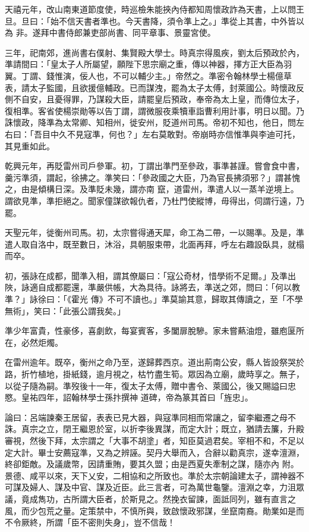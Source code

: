 \begin{pinyinscope}
 天禧元年，改山南東道節度使，時巡檢朱能挾內侍都知周懷政詐為天書，上以問王旦。旦曰：「始不信天書者準也。今天書降，須令準上之。」準從上其書，中外皆以為
 非。遂拜中書侍郎兼吏部尚書、同平章事、景靈宮使。



 三年，祀南郊，進尚書右僕射、集賢殿大學士。時真宗得風疾，劉太后預政於內，準請間曰：「皇太子人所屬望，願陛下思宗廟之重，傳以神器，擇方正大臣為羽翼。丁謂、錢惟演，佞人也，不可以輔少主。」帝然之。準密令翰林學士楊億草表，請太子監國，且欲援億輔政。已而謀洩，罷為太子太傅，封萊國公。時懷政反側不自安，且憂得罪，乃謀殺大臣，請罷皇后預政，奉帝為太上皇，而傳位太子，
 復相準。客省使楊崇勛等以告丁謂，謂微服夜乘犢車詣曹利用計事，明日以聞。乃誅懷政，降準為太常卿、知相州，徙安州，貶道州司馬。帝初不知也，他日，問左右曰：「吾目中久不見寇準，何也？」左右莫敢對。帝崩時亦信惟準與李迪可托，其見重如此。



 乾興元年，再貶雷州司戶參軍。初，丁謂出準門至參政，事準甚謹。嘗會食中書，羹污準須，謂起，徐拂之。準笑曰：「參政國之大臣，乃為官長拂須邪？」謂甚愧之，由是傾構日深。及準貶未幾，謂亦南
 竄，道雷州，準遣人以一蒸羊逆境上。謂欲見準，準拒絕之。聞家僮謀欲報仇者，乃杜門使縱博，毋得出，伺謂行遠，乃罷。



 天聖元年，徙衡州司馬。初，太宗嘗得通天犀，命工為二帶，一以賜準。及是，準遣人取自洛中，既至數日，沐浴，具朝服束帶，北面再拜，呼左右趣設臥具，就榻而卒。



 初，張詠在成都，聞準入相，謂其僚屬曰：「寇公奇材，惜學術不足爾。」及準出陜，詠適自成都罷還，準嚴供帳，大為具待。詠將去，準送之郊，問曰：「何以教準？」詠徐曰：「《霍光
 傳》不可不讀也。」準莫諭其意，歸取其傳讀之，至「不學無術」，笑曰：「此張公謂我矣。」



 準少年富貴，性豪侈，喜劇飲，每宴賓客，多闔扉脫驂。家未嘗爇油燈，雖庖匽所在，必然炬燭。



 在雷州逾年。既卒，衡州之命乃至，遂歸葬西京。道出荊南公安，縣人皆設祭哭於路，折竹植地，掛紙錢，逾月視之，枯竹盡生筍。眾因為立廟，歲時享之。無子，以從子隨為嗣。準歿後十一年，復太子太傅，贈中書令、萊國公，後又賜謚曰忠愍。皇祐四年，詔翰林學士孫抃撰神
 道碑，帝為篆其首曰「旌忠」。



 論曰：呂端諫秦王居留，表表已見大器，與寇準同相而常讓之，留李繼遷之母不誅。真宗之立，閉王繼恩於室，以折李後異謀，而定大計；既立，猶請去簾，升殿審視，然後下拜，太宗謂之「大事不胡塗」者，知臣莫過君矣。宰相不和，不足以定大計。畢士安薦寇準，又為之辨誣。契丹大舉而入，合辭以勸真宗，遂幸澶淵，終卻鉅敵。及議歲幣，因請重賄，要其久盟；由是西夏失牽制之謀，隨亦內
 附。景德、咸平以來，天下乂安，二相協和之所致也。準於太宗朝論建太子，謂神器不可謀及婦人、謀及中官、謀及近臣。此三言者，可為萬世龜鑒。澶淵之幸，力沮眾議，竟成雋功，古所謂大臣者，於斯見之。然挽衣留諫，面詆同列，雖有直言之風，而少包荒之量。定策禁中，不慎所與，致啟懷政邪謀，坐竄南裔。勛業如是而不令厥終，所謂「臣不密則失身」，豈不信哉！



\end{pinyinscope}